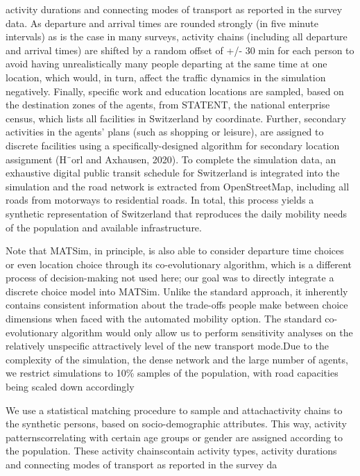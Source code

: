 \documentclass[main.tex]{subfiles}
\begin{document}
activity durations and connecting modes of transport as reported in the survey data. As departure and arrival times are rounded
strongly (in five minute intervals) as is the case in many surveys, activity chains (including all departure and arrival times) are shifted
by a random offset of +/- 30 min for each person to avoid having unrealistically many people departing at the same time at one
location, which would, in turn, affect the traffic dynamics in the simulation negatively. Finally, specific work and education locations
are sampled, based on the destination zones of the agents, from STATENT, the national enterprise census, which lists all facilities in
Switzerland by coordinate. Further, secondary activities in the agents’ plans (such as shopping or leisure), are assigned to discrete
facilities using a specifically-designed algorithm for secondary location assignment (H¨orl and Axhausen, 2020). To complete the
simulation data, an exhaustive digital public transit schedule for Switzerland is integrated into the simulation and the road network is
extracted from OpenStreetMap, including all roads from motorways to residential roads. In total, this process yields a synthetic
representation of Switzerland that reproduces the daily mobility needs of the population and available infrastructure.


Note that MATSim, in
principle, is also able to consider departure time choices or even location choice through its co-evolutionary algorithm, which is a
different process of decision-making not used here; our goal was to directly integrate a discrete choice model into MATSim. Unlike the
standard approach, it inherently contains consistent information about the trade-offs people make between choice dimensions when
faced with the automated mobility option. The standard co-evolutionary algorithm would only allow us to perform sensitivity analyses
on the relatively unspecific attractively level of the new transport mode.Due to the complexity of the simulation, the dense network and the large number of agents, we restrict simulations to 10\% samples
of the population, with road capacities being scaled down accordingly


We use a statistical matching procedure to sample and attachactivity chains to the synthetic persons, based on socio-demographic attributes. This way, activity patternscorrelating with certain age groups or gender are assigned according to the population. These activity chainscontain activity types, activity durations and connecting modes of transport as reported in the survey da
\end{document}
